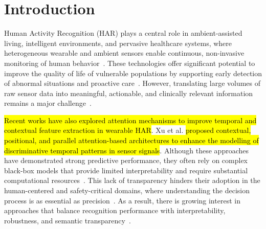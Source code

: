 \documentclass[preprint,12pt]{elsarticle}
\begin{document}
\section{Introduction}

Human Activity Recognition (HAR) plays a central role in ambient-assisted living, intelligent environments, and pervasive healthcare systems, where heterogeneous wearable and ambient sensors enable continuous, non-invasive monitoring of human behavior~\cite{wang2024application}. These technologies offer significant potential to improve the quality of life of vulnerable populations by supporting early detection of abnormal situations and proactive care~\cite{rehan2024enhancing}. However, translating large volumes of raw sensor data into meaningful, actionable, and clinically relevant information remains a major challenge~\cite{rehman2022leveraging}.

\hl{Recent works have also explored attention mechanisms to improve temporal and contextual feature extraction in wearable HAR}. Xu et al. \cite{xu2024parallel,xu2023enhanced,xu2022shallow} \hl{proposed contextual, positional, and parallel attention-based architectures to enhance the modelling of discriminative temporal patterns in sensor signals}. Although these approaches have demonstrated strong predictive performance, they often rely on complex black-box models that provide limited interpretability and require substantial computational resources~\cite{cruciani2019comparing}. This lack of transparency hinders their adoption in the human-centered and safety-critical domains, where understanding the decision process is as essential as precision~\cite{cao2024fuzzy}. As a result, there is growing interest in approaches that balance recognition performance with interpretability, robustness, and semantic transparency~\cite{alharthi2025explainable}.
\end{document}
